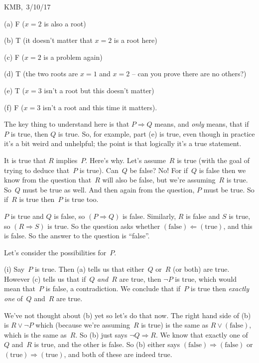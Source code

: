 \documentclass[10pt]{article}
\begin{document}
\begin{flushright} KMB,\ 3/10/17\end{flushright}


\medskip
{}

(a) F ($x=2$ is also a root)

(b) T (it doesn't matter that $x=2$ is a root here)

(c) F ($x=2$ is a problem again)

(d) T (the two roots are $x=1$ and $x=2$ -- can you prove there are no others?)

(e) T ($x=3$ isn't a root but this doesn't matter)

(f) F ($x=3$ isn't a root and this time it matters).

The key thing to understand here is that $P \Rightarrow Q$ means, and \emph{only} means, that if $P$ is true, then $Q$ is true. So, for example, part (e) is true, even though in practice it's a bit weird and unhelpful; the point is that logically it's a true statement.

 It is true that $R$ implies~$P$. Here's why. Let's assume~$R$ is true (with the goal of trying to deduce that~$P$ is true). Can~$Q$ be false? No! For if~$Q$ is false then we know from the question that~$R$ will also be false, but we're assuming~$R$ is true. So~$Q$ must be true as well. And then again from the question, $P$ must be true. So if~$R$ is true then~$P$ is true too.

\medskip{} $P$ is true and $Q$ is false, so $(P\Rightarrow Q)$ is false. Similarly, $R$ is false and $S$ is true, so $(R\Rightarrow S)$ is true. So the question asks whether $(\mbox{false})\Leftarrow(\mbox{true})$, and this is false. So the answer to the question is ``false''.

\medskip{} Let's consider the possibilities for~$P$.

(i) Say~$P$ is true. Then (a) tells us that either~$Q$ or~$R$ (or both) are true. However (c) tells us that if~$Q$ \emph{and}~$R$ are true, then $\neg P$ is true, which would mean that~$P$ is false, a contradiction. We conclude that if~$P$ is true then \emph{exactly one} of~$Q$ and~$R$ are true.

We've not thought about (b) yet so let's do that now. The right hand side of (b) is $R\vee\neg P$ which (because we're assuming~$R$ is true) is the same as $R\vee(\mbox{false})$, which is the same as~$R$. So (b) just says $\neg Q\Rightarrow R$. We know that exactly one of~$Q$ and~$R$ is true, and the other is false. So (b) either says $(\mbox{false})\Rightarrow(\mbox{false})$ or $(\mbox{true})\Rightarrow(\mbox{true})$, and both of these are indeed true.
\end{document}

